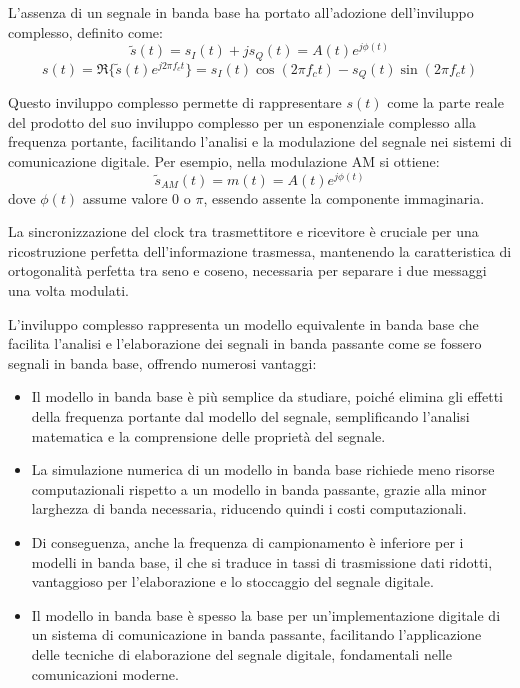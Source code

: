 L'assenza di un segnale in banda base ha portato all'adozione dell'inviluppo complesso, definito come:
\begin{equation}
    \tilde{s}(t) = s_I(t) + js_Q(t) = A(t)e^{j\phi(t)}
\end{equation}
\begin{equation}
    s(t) = \Re\{\tilde{s}(t)e^{j2\pi f_c t}\} = s_I(t)\cos(2\pi f_c t) - s_Q(t)\sin(2\pi f_c t)
\end{equation}

Questo inviluppo complesso permette di rappresentare \( s(t) \) come la parte reale del prodotto del suo inviluppo complesso per un esponenziale complesso alla frequenza portante, facilitando l'analisi e la modulazione del segnale nei sistemi di comunicazione digitale. Per esempio, nella modulazione AM si ottiene:
\begin{equation}
    \tilde{s}_{AM}(t) = m(t) = A(t)e^{j\phi(t)}
\end{equation}
dove \( \phi(t) \) assume valore \( 0 \) o \( \pi \), essendo assente la componente immaginaria.

La sincronizzazione del clock tra trasmettitore e ricevitore è cruciale per una ricostruzione perfetta dell'informazione trasmessa, mantenendo la caratteristica di ortogonalità perfetta tra seno e coseno, necessaria per separare i due messaggi una volta modulati.

L'inviluppo complesso rappresenta un modello equivalente in banda base che facilita l'analisi e l'elaborazione dei segnali in banda passante come se fossero segnali in banda base, offrendo numerosi vantaggi:
\begin{itemize}
    \item Il modello in banda base è più semplice da studiare, poiché elimina gli effetti della frequenza portante dal modello del segnale, semplificando l'analisi matematica e la comprensione delle proprietà del segnale.
    \item La simulazione numerica di un modello in banda base richiede meno risorse computazionali rispetto a un modello in banda passante, grazie alla minor larghezza di banda necessaria, riducendo quindi i costi computazionali.
    \item Di conseguenza, anche la frequenza di campionamento è inferiore per i modelli in banda base, il che si traduce in tassi di trasmissione dati ridotti, vantaggioso per l'elaborazione e lo stoccaggio del segnale digitale.
    \item Il modello in banda base è spesso la base per un'implementazione digitale di un sistema di comunicazione in banda passante, facilitando l'applicazione delle tecniche di elaborazione del segnale digitale, fondamentali nelle comunicazioni moderne.
\end{itemize}

